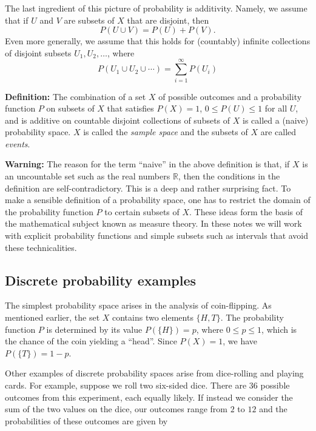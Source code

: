 \documentclass[
  oneside]{scrbook}
\begin{document}
The last ingredient of this picture of probability is additivity.
Namely, we assume that if \(U\) and \(V\) are subsets of \(X\) that are
disjoint, then \[
P(U\cup V)=P(U)+P(V).
\] Even more generally, we assume that this holds for (countably)
infinite collections of disjoint subsets \(U_1,U_2,\ldots\), where \[
P(U_1\cup U_2\cup\cdots)=\sum_{i=1}^{\infty} P(U_i)
\]

\textbf{Definition:} The combination of a set \(X\) of possible outcomes
and a probability function \(P\) on subsets of \(X\) that satisfies
\(P(X)=1\), \(0\le P(U)\le 1\) for all \(U\), and is additive on
countable disjoint collections of subsets of \(X\) is called a (naive)
probability space. \(X\) is called the \emph{sample space} and the
subsets of \(X\) are called \emph{events}.

\textbf{Warning:} The reason for the term ``naive'' in the above
definition is that, if \(X\) is an uncountable set such as the real
numbers \(\mathbb{R}\), then the conditions in the definition are
self-contradictory. This is a deep and rather surprising fact. To make a
sensible definition of a probability space, one has to restrict the
domain of the probability function \(P\) to certain subsets of \(X\).
These ideas form the basis of the mathematical subject known as measure
theory. In these notes we will work with explicit probability functions
and simple subsets such as intervals that avoid these technicalities.

\hypertarget{discrete-probability-examples}{%
\subsection{Discrete probability
examples}\label{discrete-probability-examples}}

The simplest probability space arises in the analysis of coin-flipping.
As mentioned earlier, the set \(X\) contains two elements \(\{H,T\}\).
The probability function \(P\) is determined by its value
\(P(\{H\})=p\), where \(0\le p\le 1\), which is the chance of the coin
yielding a ``head''. Since \(P(X)=1\), we have \(P(\{T\})=1-p\).

Other examples of discrete probability spaces arise from dice-rolling
and playing cards. For example, suppose we roll two six-sided dice.
There are \(36\) possible outcomes from this experiment, each equally
likely. If instead we consider the sum of the two values on the dice,
our outcomes range from \(2\) to \(12\) and the probabilities of these
outcomes are given by
\end{document}
